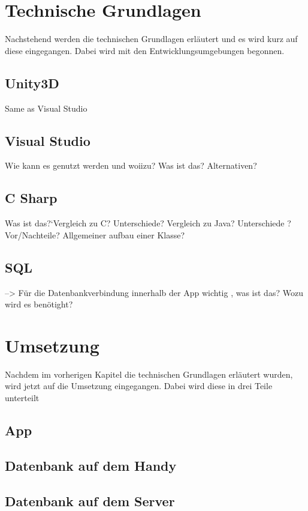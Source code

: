 \chapter{Technische Grundlagen}
	Nachstehend werden die technischen Grundlagen erläutert und es wird kurz auf diese eingegangen. Dabei wird mit den Entwicklungsumgebungen begonnen.

\section{Unity3D}

	Same as Visual Studio

\section{Visual Studio}

	Wie kann es genutzt werden und woiizu? Was ist das? Alternativen? 

\section{C Sharp}

	Was ist das?`Vergleich zu C? Unterschiede? Vergleich zu Java? Unterschiede ? Vor/Nachteile? Allgemeiner aufbau einer Klasse? 

\section{SQL}

	--> Für die Datenbankverbindung innerhalb der App wichtig , was ist das? Wozu wird es benötight?


\chapter{Umsetzung}

	Nachdem im vorherigen Kapitel die technischen Grundlagen erläutert wurden, wird jetzt auf die Umsetzung eingegangen. Dabei wird diese in drei Teile unterteilt

\section{App}
\section{Datenbank auf dem Handy}
\section{Datenbank auf dem Server}
